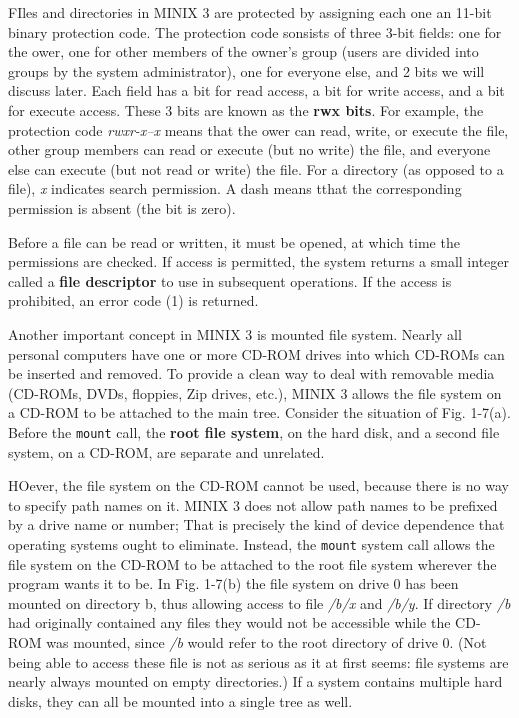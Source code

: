 \documentclass{book}
\newcommand {\kw}  [1] {\textbf{#1}}
\newcommand {\sys} [1] {\textsl{#1}}
\newcommand {\cmd} [1] {\texttt{#1}}
\begin{document}
FIles and directories in MINIX 3 are protected by assigning each one an 11-bit binary protection code.
The protection code sonsists of three 3-bit fields: one for the ower, one for other members of the owner's group 
(users are divided into groups by the system administrator), one for everyone else, and 2 bits we will discuss later.
Each field has a bit for read access, a bit for write access, and a bit for execute access.
These 3 bits are known as the \kw{rwx bits}.
For example, the protection code \sys{rwxr-x--x} means that the ower can read, write, or execute the file, 
other group members can read or execute (but no write) the file, and everyone else can execute (but not read or write) the file.
For a directory (as opposed to a file), \sys{x} indicates search permission.
A dash means tthat the corresponding permission is absent (the bit is zero).

Before a file can be read or written, it must be opened, at which time the permissions are checked.
If access is permitted, the system returns a small integer called a \kw{file descriptor} to use in subsequent operations.
If the access is prohibited, an error code (1) is returned.

Another important concept in MINIX 3 is mounted file system.
Nearly all personal computers have one or more CD-ROM drives into which CD-ROMs can be inserted and removed.
To provide a clean way to deal with removable media (CD-ROMs, DVDs, floppies, Zip drives, etc.), 
MINIX 3 allows the file system on a CD-ROM to be attached to the main tree.
Consider the situation of Fig. 1-7(a).
Before the \cmd{mount} call, the \kw{root file system}, on the hard disk, and a second file system, on a CD-ROM, are separate and unrelated.
 
HOever, the file system on the CD-ROM cannot be used, because there is no way to specify path names on it.
MINIX 3 does not allow path names to be prefixed by a drive name or number;
That is precisely the kind of device dependence that operating systems ought to eliminate.
Instead, the \cmd{mount} system call allows the file system on the CD-ROM to be attached to the root file system wherever the program wants it to be.
In Fig. 1-7(b) the file system on drive 0 has been mounted on directory b, thus allowing access to file \sys{/b/x} and \sys{/b/y}.
If directory \sys{/b} had originally contained any files they would not be accessible while the CD-ROM was mounted, 
since \sys{/b} would refer to the root directory of drive 0.
(Not being able to access these file is not as serious as it at first seems: file systems are nearly always mounted on empty directories.)
If a system contains multiple hard disks, they can all be mounted into a single tree as well.
\end{document}

